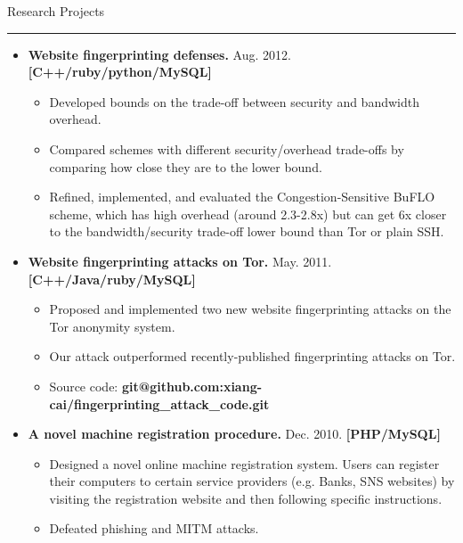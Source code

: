 \documentclass[11pt,oneside]{article}
\newenvironment{ressection}[1]{
	{\fontfamily{phv}\selectfont\Large#1}
	
	\vspace{-8pt} \rule{\textwidth}{.5pt}
	
	\vspace{-4pt}
	\begin{itemize}
	\vspace{.5pt}
}{
	\end{itemize}
}
\newcommand{\resitem}[1]{
	\vspace{2pt}
	\item \begin{flushleft} #1 \end{flushleft}
}
\begin{document}
\begin{ressection}{Research Projects}

	\resitem{\textbf{Website fingerprinting defenses.} Aug.
		2012. \hfill\textbf{[C++/ruby/python/MySQL]} 
		\vspace{-2pt}
		\begin{small}
		
		\begin{itemize}
		\item
		Developed bounds on the trade-off between security and
		bandwidth overhead.
		\item
		Compared schemes with different
		security/overhead trade-offs by comparing how close they are
		to the lower bound. 
		\item
		Refined, implemented, and evaluated
		the Congestion-Sensitive BuFLO scheme, which has high overhead (around 2.3-2.8x) but can
		get 6x closer to the bandwidth/security trade-off lower bound
		than Tor or plain SSH.
		\end{itemize}
		
		\end{small}				
	}
	\vspace{-4pt}
	\resitem{\textbf{Website fingerprinting attacks on Tor.} May.
		2011. \hfill\textbf{[C++/Java/ruby/MySQL]} 
		\vspace{-2pt}
		\begin{small}

		\begin{itemize}
		\item		
		Proposed and implemented two new website fingerprinting
			attacks on the Tor anonymity system.
		\item	
			Our attack outperformed recently-published fingerprinting attacks on Tor.
		\item			
			Source code: \textbf{git@github.com:xiang-cai/fingerprinting\_attack\_code.git}
		
		\end{itemize}		
		\end{small}				
	}

	\vspace{-4pt}
	\resitem{\textbf{A novel machine registration procedure.} Dec. 
		2010. \hfill\textbf{[PHP/MySQL]}
		\vspace{-2pt}
		\begin{small}
		
		\begin{itemize}
		\item
		Designed a novel online machine
			registration system. Users can register their computers to
			certain service providers (e.g. Banks, SNS websites) by
			visiting the registration website and then following specific
			instructions.
			\item
			Defeated phishing and MITM attacks.
		\end{itemize}
		\end{small}	
	}
			

\end{ressection}
\end{document}
